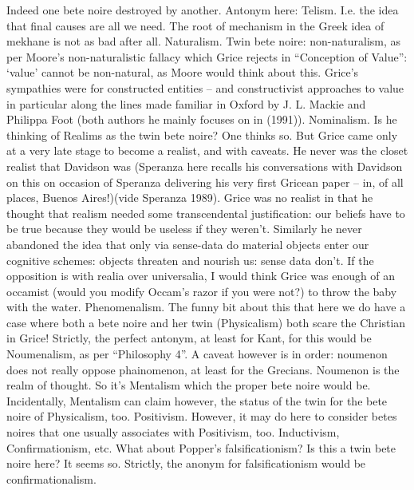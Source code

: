 \documentclass[10pt,titlepage]{book}
\begin{document}
{Indeed  one bete noire destroyed by another. Antonym here: 
Telism. I.e. the idea that  final causes are all we need.  The  root of mechanism 
in the Greek idea of mekhane is not as bad after all.   
Naturalism. Twin  bete noire: non-naturalism, as per Moore’s 
non-naturalistic fallacy which Grice  rejects in “Conception of Value”: ‘value’ cannot 
be non-natural, as Moore would  think about this. Grice’s sympathies were for 
constructed entities – and  constructivist approaches to value in 
particular along the lines made familiar  in Oxford by J. L. Mackie and Philippa Foot 
(both authors he mainly focuses on  in (1991)). 
Nominalism. Is he  thinking of Realims as the twin bete noire? One thinks 
so. But Grice came only  at a very late stage to become a realist, and with 
caveats. He never was the  closet realist that Davidson was (Speranza here 
recalls his conversations with  Davidson on this on occasion of Speranza 
delivering his very first Gricean paper  – in, of all places, Buenos Aires!)(vide 
Speranza 1989). Grice was no realist in  that he thought that realism 
needed some transcendental justification: our  beliefs have to be true because 
they would be useless if they weren’t. Similarly  he never abandoned the idea 
that only via sense-data do material objects enter  our cognitive schemes: 
objects threaten and nourish us: sense data don’t. If the  opposition is with 
realia over universalia, I would think Grice was enough of an  occamist 
(would you modify Occam’s razor if you were not?) to throw the baby  with the 
water. 
Phenomenalism. The  funny bit about this that here we do have a case where 
both a bete noire and her  twin (Physicalism) both scare the Christian in 
Grice! Strictly, the perfect  antonym, at least for Kant, for this would be 
Noumenalism, as per “Philosophy  4”. A caveat however is in order: noumenon 
does not really oppose phainomenon,  at least for the Grecians. Noumenon is 
the realm of thought. So it’s Mentalism  which the proper bete noire would 
be. Incidentally, Mentalism can claim however,  the status of the twin for the 
bete noire of Physicalism,  too. 
Positivism.  However, it may do here to consider  betes noires that one 
usually associates with Positivism, too. Inductivism,  Confirmationism, etc. 
What about Popper’s falsificationism? Is this a twin bete  noire here? It 
seems so. Strictly, the anonym for falsificationism would be  confirmationalism. 
 
}
\end{document}
